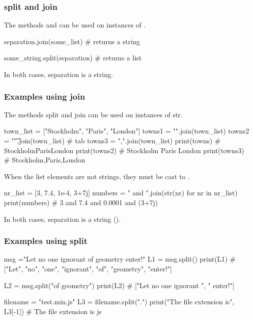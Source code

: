 \documentclass[hyperref={pdfpagelabels=false},table]{beamer}
\begin{document}
\begin{frame}[fragile]\frametitle{split and join}

  The methods  and  can be used on instances of .

\begin{python}
separation.join(some_list)    # returns a string
\end{python}

\pause

\begin{python}
some_string.split(separation) # returns a list
\end{python}

In both cases, separation is a string.

\end{frame}

\begin{frame}[fragile]\frametitle{Examples using join}

The methods split and join can be used on instances of str.

\begin{python}
town_list = ["Stockholm", "Paris", "London"]
towns1 = "".join(town_list)
towns2 = "\t".join(town_list)  # tab
towns3 = ",".join(town_list) 
print(towns)  # StockholmParisLondon
print(towns2)  # Stockholm	Paris	London
print(towns3)  # Stockholm,Paris,London
\end{python}

\pause
When the list elements are not strings, they must be cast to .

\begin{python}
nr_list = [3, 7.4, 1e-4, 3+7j]
numbers = " and ".join(str(nr) for nr in nr_list)
print(numbers) # 3 and 7.4 and 0.0001 and (3+7j)   
\end{python}

  In both cases, separation is a string ().
\end{frame}

\begin{frame}[fragile]\frametitle{Examples using split}

\begin{python}
msg ="Let no one ignorant of geometry enter!"
L1 = msg.split()
print(L1)
# ["Let", "no", "one", "ignorant", "of", "geometry", "enter!"]

L2 = msg.split("of geometry")
print(L2) # ["Let no one ignorant ", " enter!"] 
\end{python}

\begin{python}
filename = "test.min.js"
L3 = filename.split(".")
print("The file extension is", L3[-1]) 
# The file extension is js
\end{python}

\end{frame}
\end{document}
